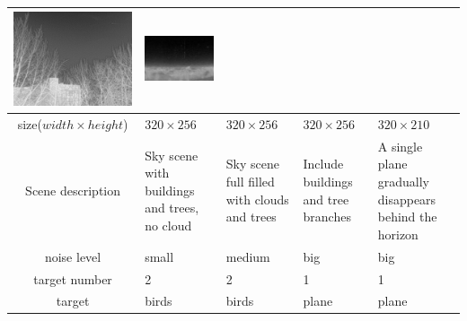 \documentclass[journal]{IEEEtran}
\begin{document}
\begin{table}[t]
\begin{tabular}{|c|m{3cm}<{\centering}|m{3cm}<{\centering}|m{3cm}<{\centering}|m{3.2cm}<{\centering}|}
    \includegraphics[scale=0.26]{real-back3.png}& 
    \includegraphics[scale=0.29]{real-back4.png}\\
    \hline
    size($width \times height$)& $320 \times 256$& $320 \times 256$& $320 \times 256$& $320\times 210$\\
    \hline
    Scene description& Sky scene with buildings and trees, no cloud & Sky scene full filled with clouds and trees & Include buildings and tree branches & A single plane gradually disappears behind the horizon\\
    \hline
    noise level & small & medium & big & big \\
    \hline
    target number & 2 & 2 & 1 & 1 \\
    \hline
    target & birds & birds & plane & plane \\
    \hline
  \end{tabular}
\end{table}
\end{document}
